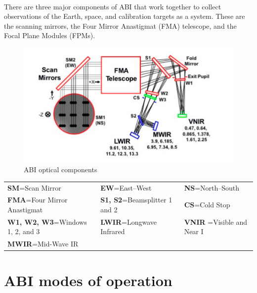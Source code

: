 \paragraph{}
There are three major components of ABI that work together to collect observations of the Earth, space, and calibration targets as a system.
These are the scanning mirrors, the Four Mirror Anastigmat (FMA) telescope, and the Focal Plane Modules (FPMs).
\begin{figure}[H]
\begin{center}
\includegraphics[scale=0.8]{abi_pos_image.png} %
\end{center}
\caption{ABI optical components}
\label{ABI optical components}%
\end{figure}
\begin{flushleft}
	\begin{tabular}{lll}
	\textbf{SM}=Scan Mirror&\textbf{EW}=East–West&\textbf{NS}=North–South \\
	\vspace{0.5\baselineskip}
	\textbf{FMA}=Four Mirror Anastigmat&\textbf{S1, S2}=Beamsplitter 1 and 2 &\textbf{CS}=Cold Stop \\
	\vspace{ 0.5\baselineskip}
	\textbf{W1, W2, W3}=Windows 1, 2, and 3&\textbf{LWIR}=Longwave Infrared&\textbf{VNIR }=Visible and Near I\\
	\textbf{MWIR}=Mid-Wave IR&&\\
	\end{tabular}
\end{flushleft}
\section{ABI modes of operation}
